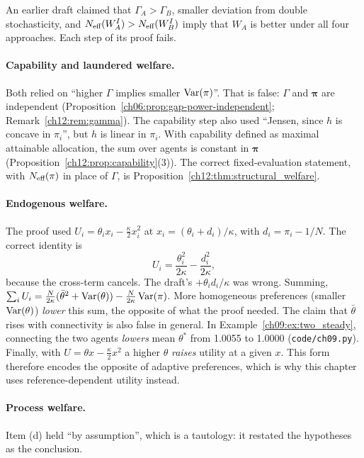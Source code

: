 \documentclass[../structural_economics_book.tex]{subfiles}
\begin{document}
An earlier draft claimed that $\Gamma_A > \Gamma_B$, smaller deviation from double stochasticity, and $N_{\text{eff}}(W^I_A) > N_{\text{eff}}(W^I_B)$ imply that $W_A$ is better under all four approaches. Each step of its proof fails.

\paragraph{Capability and laundered welfare.} Both relied on ``higher $\Gamma$ implies smaller $\operatorname{Var}(\pi)$''. That is false: $\Gamma$ and $\boldsymbol{\pi}$ are independent (Proposition~\ref{ch06:prop:gap-power-independent}; Remark~\ref{ch12:rem:gamma}). The capability step also used ``Jensen, since $h$ is concave in $\pi_i$'', but $h$ is linear in $\pi_i$. With capability defined as maximal attainable allocation, the sum over agents is constant in $\boldsymbol{\pi}$ (Proposition~\ref{ch12:prop:capability}(3)). The correct fixed-evaluation statement, with $N_{\text{eff}}(\pi)$ in place of $\Gamma$, is Proposition~\ref{ch12:thm:structural_welfare}.

\paragraph{Endogenous welfare.} The proof used $U_i = \theta_i x_i - \frac{\kappa}{2}x_i^2$ at $x_i = (\theta_i + d_i)/\kappa$, with $d_i = \pi_i - 1/N$. The correct identity is
\[
U_i = \frac{\theta_i^2}{2\kappa} - \frac{d_i^2}{2\kappa},
\]
because the cross-term cancels. The draft's $+\theta_i d_i/\kappa$ was wrong. Summing, $\sum_i U_i = \frac{N}{2\kappa}(\bar{\theta}^2 + \operatorname{Var}(\theta)) - \frac{N}{2\kappa}\operatorname{Var}(\pi)$. More homogeneous preferences (smaller $\operatorname{Var}(\theta)$) \textit{lower} this sum, the opposite of what the proof needed. The claim that $\bar{\theta}$ rises with connectivity is also false in general. In Example~\ref{ch09:ex:two_steady}, connecting the two agents \textit{lowers} mean $\theta^*$ from 1.0055 to 1.0000 (\texttt{code/ch09.py}). Finally, with $U = \theta x - \frac{\kappa}{2}x^2$ a higher $\theta$ \textit{raises} utility at a given $x$. This form therefore encodes the opposite of adaptive preferences, which is why this chapter uses reference-dependent utility instead.

\paragraph{Process welfare.} Item (d) held ``by assumption'', which is a tautology: it restated the hypotheses as the conclusion.
\end{document}
